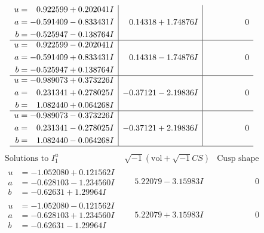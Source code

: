 \documentclass[1p]{elsarticle_modified}
\theoremstyle{definition}
\newcommand{\I}{\sqrt{-1}}
\begin{document}
$$\begin{array}{c|c|c}
\begin{aligned}
u &= \phantom{-}0.922599 + 0.202041 I \\
a &= -0.591409 - 0.833431 I \\
b &= -0.525947 - 0.138764 I\end{aligned}
 & \phantom{-}0.14318 + 1.74876 I & \phantom{-0.000000 } 0 \\ \hline\begin{aligned}
u &= \phantom{-}0.922599 - 0.202041 I \\
a &= -0.591409 + 0.833431 I \\
b &= -0.525947 + 0.138764 I\end{aligned}
 & \phantom{-}0.14318 - 1.74876 I & \phantom{-0.000000 } 0 \\ \hline\begin{aligned}
u &= -0.989073 + 0.373226 I \\
a &= \phantom{-}0.231341 + 0.278025 I \\
b &= \phantom{-}1.082440 + 0.064268 I\end{aligned}
 & -0.37121 - 2.19836 I & \phantom{-0.000000 } 0 \\ \hline\begin{aligned}
u &= -0.989073 - 0.373226 I \\
a &= \phantom{-}0.231341 - 0.278025 I \\
b &= \phantom{-}1.082440 - 0.064268 I\end{aligned}
 & -0.37121 + 2.19836 I & \phantom{-0.000000 } 0\\
 \hline 
 \end{array}$$\newpage$$\begin{array}{c|c|c}  
\text{Solutions to }I^u_{1}& \I (\text{vol} + \sqrt{-1}CS) & \text{Cusp shape}\\
 \hline 
\begin{aligned}
u &= -1.052080 + 0.121562 I \\
a &= -0.628103 - 1.234560 I \\
b &= -0.62631 + 1.29964 I\end{aligned}
 & \phantom{-}5.22079 - 3.15983 I & \phantom{-0.000000 } 0 \\ \hline\begin{aligned}
u &= -1.052080 - 0.121562 I \\
a &= -0.628103 + 1.234560 I \\
b &= -0.62631 - 1.29964 I\end{aligned}
 & \phantom{-}5.22079 + 3.15983 I & \phantom{-0.000000 } 0 \\ \hline\begin{aligned}

\end{aligned}
\end{array}$$
\end{document}
